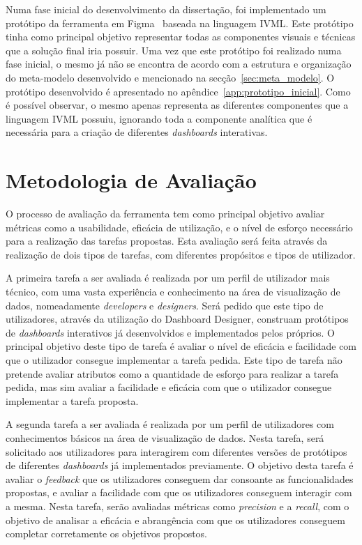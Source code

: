 Numa fase inicial do desenvolvimento da dissertação, foi implementado um protótipo da ferramenta em Figma~\cite{figma} baseada na linguagem \gls{IVML}. Este protótipo tinha como principal objetivo representar todas as componentes visuais e técnicas que a solução final iria possuir. Uma vez que este protótipo foi realizado numa fase inicial, o mesmo já não se encontra de acordo com a estrutura e organização do meta-modelo desenvolvido e mencionado na secção~\ref{sec:meta_modelo}. O protótipo desenvolvido é apresentado no apêndice~\ref{app:prototipo_inicial}. Como é possível observar, o mesmo apenas representa as diferentes componentes que a linguagem \gls{IVML} possuiu, ignorando toda a componente analítica que é necessária para a criação de diferentes \textit{dashboards} interativas.

\section{Metodologia de Avaliação} %
\label{sec:metodologia_avaliacao}

O processo de avaliação da ferramenta tem como principal objetivo avaliar métricas como a usabilidade, eficácia de utilização, e o nível de esforço necessário para a realização das tarefas propostas. Esta avaliação será feita através da realização de dois tipos de tarefas, com diferentes propósitos e tipos de utilizador.

A primeira tarefa a ser avaliada é realizada por um perfil de utilizador mais técnico, com uma vasta experiência e conhecimento na área de visualização de dados, nomeadamente \textit{developers} e \textit{designers}. Será pedido que este tipo de utilizadores, através da utilização do Dashboard Designer, construam protótipos de \textit{dashboards} interativos já desenvolvidos e implementados pelos próprios. O principal objetivo deste tipo de tarefa é avaliar o nível de eficácia e facilidade com que o utilizador consegue implementar a tarefa pedida. Este tipo de tarefa não pretende avaliar atributos como a quantidade de esforço para realizar a tarefa pedida, mas sim avaliar a facilidade e eficácia com que o utilizador consegue implementar a tarefa proposta.

A segunda tarefa a ser avaliada é realizada por um perfil de utilizadores com conhecimentos básicos na área de visualização de dados. Nesta tarefa, será solicitado aos utilizadores para interagirem com diferentes versões de protótipos de diferentes \textit{dashboards} já implementados previamente. O objetivo desta tarefa é avaliar o \textit{feedback} que os utilizadores conseguem dar consoante as funcionalidades propostas, e avaliar a facilidade com que os utilizadores conseguem interagir com a mesma. Nesta tarefa, serão avaliadas métricas como \textit{precision} e a \textit{recall}, com o objetivo de analisar a eficácia e abrangência com que os utilizadores conseguem completar corretamente os objetivos propostos.

